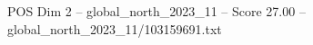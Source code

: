 \begin{textsample}{POS Dim 2 – global\_north\_2023\_11 – Score 27.00 – global\_north\_2023\_11/103159691.txt}
\end{textsample}
